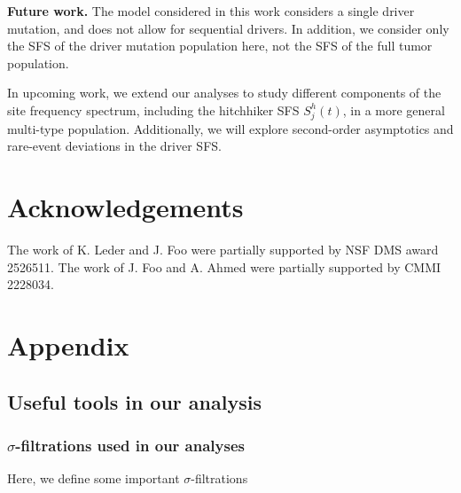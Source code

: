 \documentclass{article}
\numberwithin{equation}{section}
\begin{document}
\textbf{Future work.} The model considered in this work considers a single driver mutation, and does not allow for sequential drivers. In addition, we consider only the SFS of the driver mutation population here, not the SFS of the full tumor population.  

In upcoming work, we extend our analyses to study different components of the site frequency spectrum, including the hitchhiker SFS $S_j^h(t)$, in a more general multi-type population. Additionally, we will explore second-order asymptotics and rare-event deviations in the driver SFS.

\section{Acknowledgements}
The work of K. Leder and J. Foo were partially supported by NSF DMS award 2526511. The work of J. Foo and A. Ahmed were partially supported by CMMI 2228034.  

\printbibliography

\appendix

\section{Appendix}

\subsection{Useful tools in our analysis}

\subsubsection{$\sigma$-filtrations used in our analyses}

Here, we define some important $\sigma$-filtrations
\end{document}
